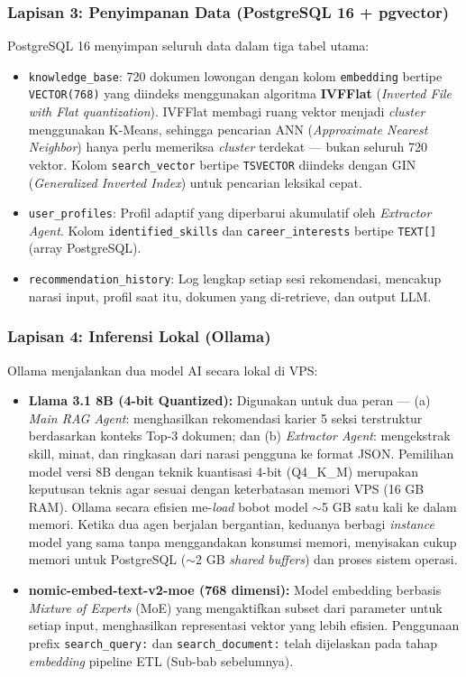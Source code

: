 \subsubsection{Lapisan 3: Penyimpanan Data (PostgreSQL 16 + pgvector)}
PostgreSQL 16 menyimpan seluruh data dalam tiga tabel utama:
\begin{itemize}
  \item \texttt{knowledge\_base}: 720 dokumen lowongan dengan kolom \texttt{embedding}
    bertipe \texttt{VECTOR(768)} yang diindeks menggunakan algoritma \textbf{IVFFlat}
    (\textit{Inverted File with Flat quantization}). IVFFlat membagi ruang vektor
    menjadi \textit{cluster} menggunakan K-Means, sehingga pencarian ANN
    (\textit{Approximate Nearest Neighbor}) hanya perlu memeriksa \textit{cluster}
    terdekat --- bukan seluruh 720 vektor. Kolom \texttt{search\_vector} bertipe
    \texttt{TSVECTOR} diindeks dengan GIN (\textit{Generalized Inverted Index})
    untuk pencarian leksikal cepat.
  \item \texttt{user\_profiles}: Profil adaptif yang diperbarui akumulatif oleh
    \textit{Extractor Agent}. Kolom \texttt{identified\_skills} dan
    \texttt{career\_interests} bertipe \texttt{TEXT[]} (array PostgreSQL).
  \item \texttt{recommendation\_history}: Log lengkap setiap sesi rekomendasi,
    mencakup narasi input, profil saat itu, dokumen yang di-retrieve, dan output LLM.
\end{itemize}

\subsubsection{Lapisan 4: Inferensi Lokal (Ollama)}
Ollama menjalankan dua model AI secara lokal di VPS:
\begin{itemize}
  \item \textbf{Llama 3.1 8B (4-bit Quantized):} Digunakan untuk dua peran ---
    (a) \textit{Main RAG Agent}: menghasilkan rekomendasi karier 5 seksi terstruktur
    berdasarkan konteks Top-3 dokumen; dan (b) \textit{Extractor Agent}: mengekstrak
    skill, minat, dan ringkasan dari narasi pengguna ke format JSON.
    Pemilihan model versi 8B dengan teknik kuantisasi 4-bit (Q4\_K\_M) merupakan keputusan
    teknis agar sesuai dengan keterbatasan memori VPS (16 GB RAM). Ollama secara efisien
    me-\textit{load} bobot model $\sim$5 GB satu kali ke dalam memori. Ketika dua agen
    berjalan bergantian, keduanya berbagi \textit{instance} model yang sama tanpa
    menggandakan konsumsi memori, menyisakan cukup memori untuk PostgreSQL
    ($\sim$2 GB \textit{shared buffers}) dan proses sistem operasi.
  \item \textbf{nomic-embed-text-v2-moe (768 dimensi):} Model embedding berbasis
    \textit{Mixture of Experts} (MoE) yang mengaktifkan subset dari parameter untuk
    setiap input, menghasilkan representasi vektor yang lebih efisien. Penggunaan
    prefix \texttt{search\_query:} dan \texttt{search\_document:} telah dijelaskan
    pada tahap \textit{embedding} pipeline ETL (Sub-bab sebelumnya).
\end{itemize}

